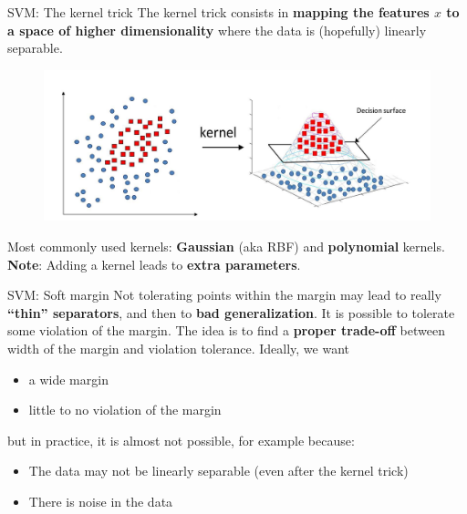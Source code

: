 \documentclass{beamer}
\begin{document}
%
\begin{frame}{SVM: The kernel trick}
The kernel trick consists in \textbf{mapping the features $x$ to a space of higher dimensionality} where the data is (hopefully) linearly separable.
\pause
\begin{figure}
\centering
\includegraphics[width=\textwidth]{images/kernel_trick_3d.jpg}
\end{figure}

Most commonly used kernels: \textbf{Gaussian} (aka RBF) and \textbf{polynomial} kernels.
\pause
\vfill \textbf{Note}: Adding a kernel leads to \textbf{extra parameters}.
\end{frame}
%
\begin{frame}{SVM: Soft margin}
Not tolerating points within the margin may lead to really \textbf{``thin'' separators}, and then to \textbf{bad generalization}.
\pause
\vfill 
It is possible to tolerate some violation of the margin. The idea is to find a \textbf{proper trade-off} between width of the margin and violation tolerance.
\pause
\vfill 
Ideally, we want 
\begin{itemize}
	\item a wide margin
	\item little to no violation of the margin
\end{itemize}
\pause
\vfill 
but in practice, it is almost not possible, for example because:
\begin{itemize}
	\item The data may not be linearly separable (even after the kernel trick)
	\item There is noise in the data
\end{itemize}
\end{frame}
%
\end{document}
